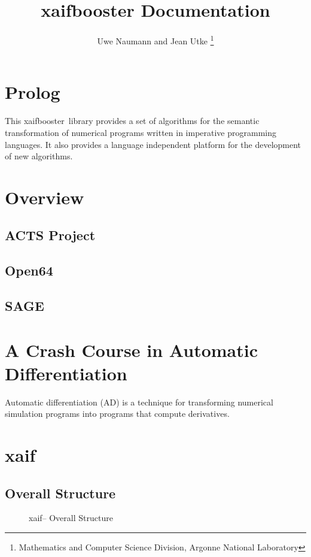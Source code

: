 \documentclass{book}
\title{xaifbooster Documentation}
\author{Uwe Naumann and Jean Utke \thanks{Mathematics and Computer Science Division, Argonne National Laboratory}}
\newcommand{\xaif}{xaif}
\newcommand{\xaifbooster}{xaifbooster}
\begin{document}
\maketitle

\tableofcontents

\chapter*{Prolog}

This \xaifbooster~library provides a set of
algorithms for the semantic transformation of
numerical programs written in imperative programming
languages. It also provides a language independent
platform for the development of new algorithms.


\chapter{Overview}

\section{ACTS Project}

\section{Open64}

\section{SAGE}

\chapter{A Crash Course in Automatic Differentiation}

Automatic differentiation (AD) \cite{CG91, BBCG96, CFG+01, Gri00} 
is a technique for transforming numerical
simulation programs into programs that compute derivatives.

\chapter{xaif}

\section{Overall Structure}

\begin{figure}
\caption{\xaif -- Overall Structure}
\label{fig:xaif_structure}
\end{figure}
\end{document}
